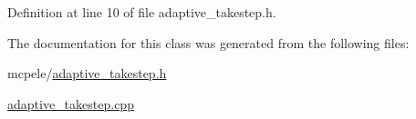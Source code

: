 \-Definition at line 10 of file adaptive\-\_\-takestep.\-h.



\-The documentation for this class was generated from the following files\-:\begin{DoxyCompactItemize}
\item 
mcpele/\hyperlink{adaptive__takestep_8h}{adaptive\-\_\-takestep.\-h}\item 
\hyperlink{adaptive__takestep_8cpp}{adaptive\-\_\-takestep.\-cpp}\end{DoxyCompactItemize}

